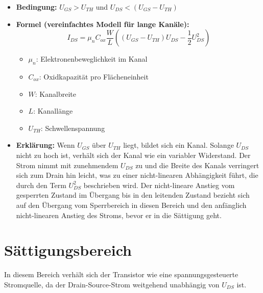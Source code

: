 \documentclass[oneside]{scrarticle}
\numberwithin{equation}{section}
\begin{document}
\begin{itemize}
	\item \textbf{Bedingung:} $U_{GS} > U_{TH}$ und $U_{DS} < (U_{GS} - U_{TH})$
	\item \textbf{Formel (vereinfachtes Modell für lange Kanäle):}
	\begin{equation*}
		I_{DS} = \mu_n C_{ox} \frac{W}{L} \left( (U_{GS} - U_{TH})U_{DS} - \frac{1}{2}U_{DS}^2 \right)
	\end{equation*}
	\begin{itemize}
		\item $\mu_n$: Elektronenbeweglichkeit im Kanal
		\item $C_{ox}$: Oxidkapazität pro Flächeneinheit
		\item $W$: Kanalbreite
		\item $L$: Kanallänge
		\item $U_{TH}$: Schwellenspannung
	\end{itemize}
	\item \textbf{Erklärung:} Wenn $U_{GS}$ über $U_{TH}$ liegt, bildet sich ein Kanal. Solange $U_{DS}$ nicht zu hoch ist, verhält sich der Kanal wie ein variabler Widerstand. Der Strom nimmt mit zunehmendem $U_{DS}$ zu und die Breite des Kanals verringert sich zum Drain hin leicht, was zu einer nicht-linearen Abhängigkeit führt, die durch den Term $U_{DS}^2$ beschrieben wird. Der nicht-lineare Anstieg vom gesperrten Zustand im Übergang bis in den leitenden Zustand bezieht sich auf den Übergang vom Sperrbereich in diesen Bereich und den anfänglich nicht-linearen Anstieg des Stroms, bevor er in die Sättigung geht.
\end{itemize}

\section{Sättigungsbereich}
In diesem Bereich verhält sich der Transistor wie eine spannungsgesteuerte Stromquelle, da der Drain-Source-Strom weitgehend unabhängig von $U_{DS}$ ist.
\end{document}
